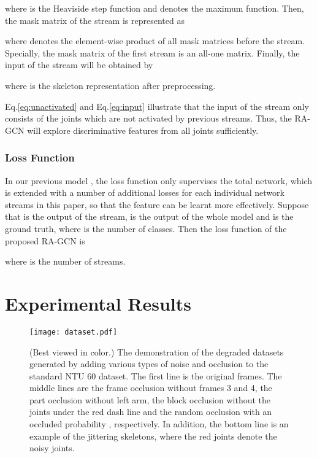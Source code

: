 \documentclass[journal]{IEEEtran}
\begin{document}
where  is the Heaviside step function and  denotes the maximum function. Then, the mask matrix of the  stream is represented as

where  denotes the element-wise product of all mask matrices before the  stream. Specially, the mask matrix of the first stream is an all-one matrix. Finally, the input of the  stream will be obtained by

where  is the skeleton representation after preprocessing.

Eq.\ref{eq:unactivated} and Eq.\ref{eq:input} illustrate that the input of the  stream only consists of the joints which are not activated by previous streams. Thus, the RA-GCN will explore discriminative features from all joints sufficiently.

\subsubsection{Loss Function}
\label{sssec:loss}

In our previous model \cite{song2019richly}, the loss function only supervises the total network, which is extended with a number of additional losses for each individual network streams in this paper, so that the feature can be learnt more effectively. Suppose that  is the output of the  stream,  is the output of the whole model and  is the ground truth, where  is the number of classes. Then the loss function of the proposed RA-GCN is

where  is the number of streams.


\section{Experimental Results}
\label{sec:experiments}

\begin{figure}[t]
    \centering
    \texttt{[image: dataset.pdf]}
    \caption{(Best viewed in color.) The demonstration of the degraded datasets generated by adding various types of noise and occlusion to the standard NTU 60 dataset. The first line is the original frames. The middle lines are the frame occlusion without frames 3 and 4, the part occlusion without left arm, the block occlusion without the joints under the red dash line and the random occlusion with an occluded probability , respectively. In addition, the bottom line is an example of the jittering skeletons, where the {\color{red}red} joints denote the noisy joints.}
    \label{fig:dataset}
\end{figure}
\end{document}
